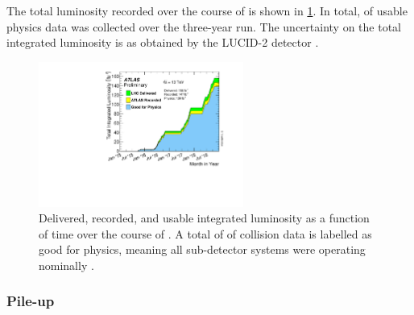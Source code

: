 The total luminosity recorded over the course of \runtwo is shown in \cref{fig:run2_lumi}. In total, \intlumi of usable physics data was collected over the three-year run.
The uncertainty on the total integrated luminosity is  \cite{ATLAS-CONF-2019-021} as obtained by the LUCID-2 detector \cite{Avoni:2633501}.
%
\begin{figure}[!htbp]
  \centering
  \includegraphics[width=0.6\textwidth]{chapters/2.detector/figs/intlumivstimeRun2DQall.pdf}
  \caption{
    Delivered, recorded, and usable integrated luminosity as a function of time over the course of \runtwo \cite{atlas-lumi-run2}.
    A total of \intlumi of collision data is labelled as good for physics, meaning all sub-detector systems were operating nominally \cite{DAPR-2018-01}.}
  \label{fig:run2_lumi}
\end{figure}
%


\subsubsection{Pile-up}

